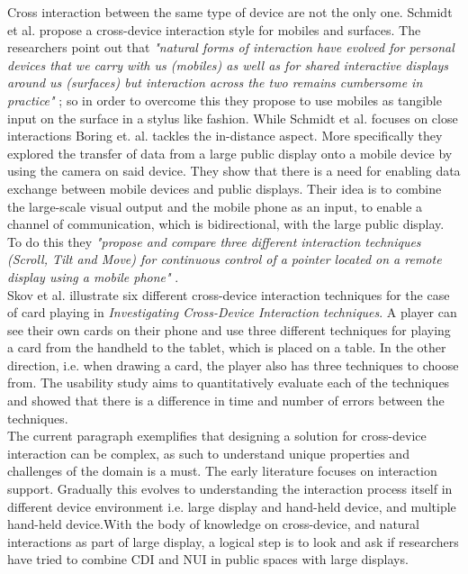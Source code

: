 Cross interaction between the same type of device are not the only one. Schmidt et al. propose a cross-device interaction style for mobiles and surfaces. The researchers point out that \emph{"natural forms of interaction have evolved for personal devices that we carry with us (mobiles) as well as for shared interactive displays around us (surfaces) but interaction across the two remains cumbersome in practice"} \cite{Schmidt:2012}; so in order to overcome this they propose to use mobiles as tangible input on the surface in a stylus like fashion. While Schmidt et al. focuses on close interactions Boring et. al. tackles the in-distance aspect. More specifically they explored
the transfer of data from a large public display onto a mobile
device by using the camera on said device.  They show
that there is a need for enabling data exchange between mobile
devices and public displays. Their idea is to combine the large-scale visual output and the mobile phone as an input, to enable a channel of communication, which is bidirectional, with the large public display. To do this they \emph{"propose and compare three different interaction techniques (Scroll, Tilt and Move) for continuous control of a pointer located on a remote display using a mobile phone"} \cite{Boring:2009}.\\

Skov et al. \cite{Skov:2015} illustrate six different cross-device interaction techniques for the case of card playing in \emph{Investigating Cross-Device Interaction techniques}.
A player can see their own cards on their phone and use three different techniques for playing a card from the handheld to the tablet, which is placed on a table.
In the other direction, i.e. when drawing a card, the player also has three techniques to choose from.
The usability study aims to quantitatively evaluate each of the techniques and showed that there is a difference in time and number of errors between the techniques. \\

The current paragraph exemplifies that designing a solution for cross-device interaction can be complex, as such to understand  unique properties and challenges of the domain is a must. The early literature focuses on interaction support. Gradually this evolves to understanding the interaction process itself in different device environment i.e. large display and hand-held device, and multiple hand-held device.With the body of knowledge on cross-device, and natural interactions as part of large display, a logical step is to look and ask if researchers have tried to combine CDI and NUI in public spaces with large displays.
